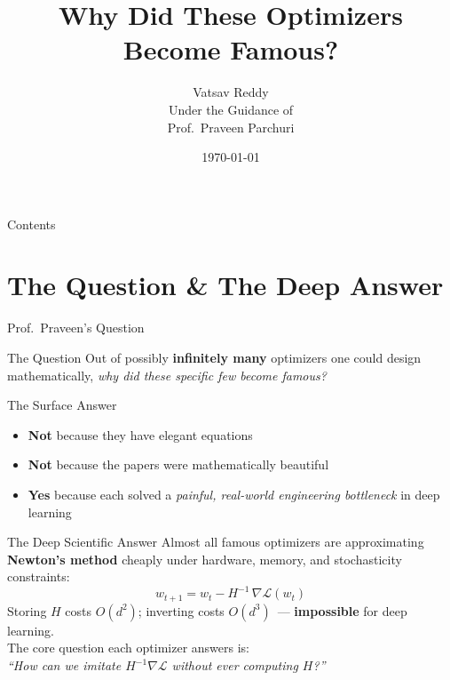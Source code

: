 \documentclass{beamer}
\title[Why Optimizers Became Famous]{%
  Why Did These Optimizers\\[4pt]
  Become Famous?}
\author[Vatsav Reddy]{%
  \texorpdfstring{%
    {\Large Vatsav Reddy}\\[6pt]
    {\small Under the Guidance of}\\[2pt]
    {\small Prof.\ Praveen Parchuri}%
  }{Vatsav Reddy}}
\institute[IIITH]{%
  {\normalsize International Institute of Information Technology, Hyderabad}}
\date{\today}
\begin{document}

\begin{frame}
  \titlepage
\end{frame}

\begin{frame}[shrink=10]{Contents}
  \tableofcontents
\end{frame}


\section{The Question \& The Deep Answer}

\begin{frame}[shrink=10]{Prof.\ Praveen's Question}
  \begin{alertblock}{The Question}
    Out of possibly \textbf{infinitely many} optimizers one could
    design mathematically, \textit{why did these specific few become
    famous?}
  \end{alertblock}

  \bigskip

  \begin{block}{The Surface Answer}
    \begin{itemize}\setlength\itemsep{5pt}
      \item \textbf{Not} because they have elegant equations
      \item \textbf{Not} because the papers were mathematically beautiful
      \item \textbf{Yes} because each solved a \emph{painful,
            real-world engineering bottleneck} in deep learning
    \end{itemize}
  \end{block}

  \bigskip

  \begin{exampleblock}{The Deep Scientific Answer}
    Almost all famous optimizers are approximating
    \textbf{Newton's method} cheaply under hardware, memory,
    and stochasticity constraints:
    \[
      w_{t+1} = w_t - H^{-1}\,\nabla\mathcal{L}(w_t)
    \]
    Storing $H$ costs $O(d^2)$; inverting costs $O(d^3)$~---
    \textbf{impossible} for deep learning.\\[4pt]
    The core question each optimizer answers is:\\
    \textit{``How can we imitate $H^{-1}\nabla\mathcal{L}$
    without ever computing $H$?''}
  \end{exampleblock}
\end{frame}
\end{document}
